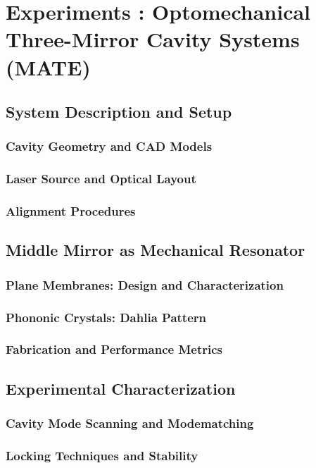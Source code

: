 

\chapter{Experiments : Optomechanical Three-Mirror Cavity Systems (MATE)}\label{chap:squeezer}
\section{System Description and Setup}
\subsection{Cavity Geometry and CAD Models}
\subsection{Laser Source and Optical Layout}
\subsection{Alignment Procedures}
\hspace{1pt}
\section{Middle Mirror as Mechanical Resonator}
\subsection{Plane Membranes: Design and Characterization}
\subsection{Phononic Crystals: Dahlia Pattern}
\subsection{Fabrication and Performance Metrics}
\hspace{1pt}
\section{Experimental Characterization}
\subsection{Cavity Mode Scanning and Modematching}
\subsection{Locking Techniques and Stability}
